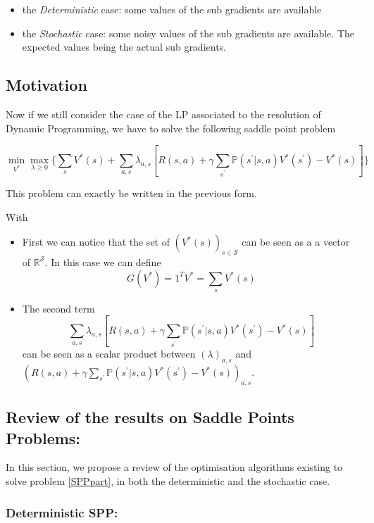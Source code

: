 \documentclass[12pt,reqno]{amsart}
\numberwithin{equation}{section}
\begin{document}
\begin{itemize}
\item the \emph{Deterministic} case: some values of the sub gradients are available
\item the \emph{Stochastic} case:  some noisy values of the sub gradients are available. 
The expected values being the actual sub gradients.
\end{itemize}

\subsection{Motivation}

Now if we still consider the case of the LP associated to the resolution of Dynamic Programming,
we have to solve the following saddle point problem

$$
\min_{V^{*}}\max_{\lambda \geq 0}\{ \sum_{s} V^{*}(s) + \sum_{a,s}\lambda_{a,s}[R(s,a) + \gamma \sum_{s^{'}}\mathbb{P}(s^{'}| s,a )V^{*}(s^{'}) - V^{*}(s)] \}
$$

This problem can exactly be written in the previous form.


With 

\begin{itemize}
\item First we can notice that the set of $(V^{*}(s))_{s \in \mathcal{S}}$ 
can be seen as a a vector of $\mathbb{R}^{\mathcal{S}}$. In this case we can define
$$G(V^{*}) = 1^{T}V^{*} = \sum_{s} V^{*}(s)$$
\item The second term 
$$
\sum_{a,s}\lambda_{a,s}[R(s,a) + \gamma \sum_{s^{'}}\mathbb{P}(s^{'}| s,a )V^{*}(s^{'}) - V^{*}(s)]
$$
can be seen as a scalar product between $(\lambda)_{a,s}$ and $(R(s,a) + \gamma \sum_{s^{'}}\mathbb{P}(s^{'}| s,a )V^{*}(s^{'}) - V^{*}(s))_{a,s}$.

\end{itemize}

\subsection{ Review of the results on Saddle Points Problems: }


In this section, we propose a review of the optimisation algorithms existing to solve problem \ref{SPPpart}, in both the deterministic and the stochastic case.

\subsubsection{Deterministic SPP: }
\end{document}

